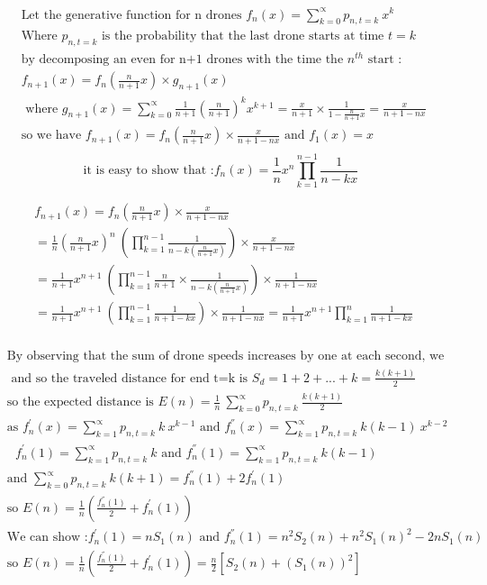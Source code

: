 \documentclass[10pt,a4paper]{letter}
\begin{document}
\begin{align*}
	&\text{Let the generative function for n drones }f_{n}(x)= \sum_{k=0}^{\propto}{p_{n,t=k}\ x^{k}}\\
	&\text{Where }p_{n,t=k}\text{ is the probability that the last drone starts at time }t=k \\
	&\text{by decomposing an even for n+1 drones with the time the }n^{th} \text{ start :}\\
	&f_{n+1}(x)=f_{n}(\frac{n}{n+1}x)\times g_{n+1}(x)\\
	&\text{ where } g_{n+1}(x)=\sum_{k=0}^{\propto}\frac{1}{n+1}(\frac{n}{n+1})^{k}x^{k+1}=\frac{x}{n+1}\times \frac{1}{1-\frac{n}{n+1}x}=\frac{x}{n+1-nx}\\
	&\text{so we have }f_{n+1}(x)=f_{n}(\frac{n}{n+1}x)\times \frac{x}{n+1-nx}\text{ and }f_{1}(x)=x\\
\end{align*}
	$$ \text{ it is easy to show that :}f_{n}(x)=\frac{1}{n}x^{n} \prod _{k=1}^{n-1}\frac{1}{n-kx} $$


\begin{align*}
&f_{n+1}(x)=f_{n}(\frac{n}{n+1}x)\times \frac{x}{n+1-nx}\\
&=\frac{1}{n}(\frac{n}{n+1}x)^{n}\ (\prod _{k=1}^{n-1}\frac{1}{n-k(\frac{n}{n+1}x)})\times \frac{x}{n+1-nx}\\
&=\frac{1}{n+1}x^{n+1}\ (\prod _{k=1}^{n-1}\frac{n}{n+1}\times \frac{1}{n-k(\frac{n}{n+1}x)})\times \frac{1}{n+1-nx}\\
&=\frac{1}{n+1}x^{n+1}\ (\prod _{k=1}^{n-1} \frac{1}{n+1-kx})\times \frac{1}{n+1-nx}=\frac{1}{n+1}x^{n+1} \prod _{k=1}^{n} \frac{1}{n+1-kx}\\
\end{align*}

\begin{align*}
&\text{By observing that the sum of drone speeds increases by one at each second, we have Sum(v)=t}\\
&\text{ and so the traveled distance for end t=k is } S_{d}=1+2+...+k=\frac{k(k+1)}{2}\\
&\text{so the expected distance is }E(n)=\frac{1}{n}\ \sum_{k=0}^{\propto}{p_{n,t=k}\ \frac{k(k+1)}{2}}\\
&\text{as }f^{'}_{n}(x)= \sum_{k=1}^{\propto}{p_{n,t=k}\ k\ x^{k-1}}\text{ and }f^{''}_{n}(x)= \sum_{k=1}^{\propto}{p_{n,t=k}\ k(k-1)\ x^{k-2}}\\ 
&\text{\ \ \ }f^{'}_{n}(1)= \sum_{k=1}^{\propto}{p_{n,t=k}\ k}\text{ and }f^{''}_{n}(1)= \sum_{k=1}^{\propto}{p_{n,t=k}\ k(k-1)}\\
&\text{and }\sum_{k=0}^{\propto}{p_{n,t=k}\ k(k+1)}=f^{''}_{n}(1)+2f^{'}_{n}(1)\\
&\text{so }E(n)=\frac{1}{n}(\frac{f^{''}_{n}(1)}{2}+f^{'}_{n}(1))\\
&\text{We can show :}f^{'}_{n}(1)=nS_{1}(n)\text{ and }
f^{''}_{n}(1)=n^{2}S_{2}(n)+n^{2}S_{1}(n)^{2}-2nS_{1}(n)\\
&\text{so } E(n)=\frac{1}{n}(\frac{f^{''}_{n}(1)}{2}+f^{'}_{n}(1))=\frac{n}{2}[S_{2}(n)+(S_{1}(n))^{2}]\\
\end{align*}
\end{document}
